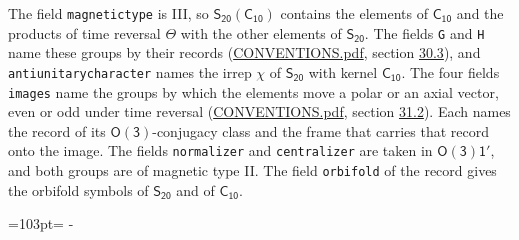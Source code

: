 \documentclass[10pt,a4paper]{article}
\newcommand{\needspace}[1]{\par\penalty-100\begingroup\dimen0=#1\relax\dimen2=\pagegoal
  \advance\dimen2-\pagetotal\ifdim\dimen0>\dimen2\relax\ifdim\dimen2>0pt\vfil\break\fi\fi
  \endgroup}
\numberwithin{equation}{section}
\newcommand{\grp}[1]{\mathsf{#1}}
\begin{document}
The field \texttt{magnetictype} is III, so $\grp{S_{20}}(\grp{C_{10}})$ contains the elements of $\grp{C_{10}}$ and the products of time reversal $\varTheta$ with the other elements of $\grp{S_{20}}$. The fields \texttt{G} and \texttt{H} name these groups by their records (\href{../../CONVENTIONS.pdf}{CONVENTIONS.pdf}, section \href{../../CONVENTIONS.pdf\#conv.30.3}{30.3}), and \texttt{antiunitarycharacter} names the irrep $\chi$ of $\grp{S_{20}}$ with kernel $\grp{C_{10}}$. The four fields \texttt{images} name the groups by which the elements move a polar or an axial vector, even or odd under time reversal (\href{../../CONVENTIONS.pdf}{CONVENTIONS.pdf}, section \href{../../CONVENTIONS.pdf\#conv.31.2}{31.2}). Each names the record of its $\grp{O(3)}$-conjugacy class and the frame that carries that record onto the image. The fields \texttt{normalizer} and \texttt{centralizer} are taken in $\grp{O(3)1'}$, and both groups are of magnetic type II. The field \texttt{orbifold} of the record gives the orbifold symbols of $\grp{S_{20}}$ and of $\grp{C_{10}}$.
\needspace{103pt}
\end{document}
